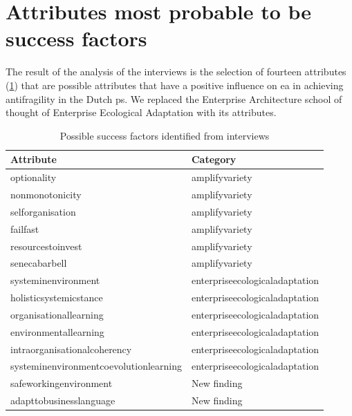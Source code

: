 \section{Attributes most probable to be success factors}
\label{sec:attributeslikelysf}
The result of the analysis of the interviews is the selection of fourteen attributes (\cref{tab:interviewpossiblesf}) that are possible attributes that have a positive influence on \gls{ea} in achieving \gls{antifragility} in the Dutch \gls{ps}. We replaced the Enterprise Architecture school of thought of Enterprise Ecological Adaptation with its \glspl{attribute}.
\begin{longtable}{@{}ll@{}}
	\toprule%
	\textbf{Attribute} & \textbf{Category}  \\%
	\midrule%
	\endhead%
	\hline
	\endfoot%
	\caption[Possible success factors identified from interviews]{Possible success factors identified from interviews}
	\label{tab:interviewpossiblesf}
	\endlastfoot%
	\Gls{optionality} & \Gls{amplifyvariety} \\%
	\Gls{nonmonotonicity} & \Gls{amplifyvariety} \\%
	\Gls{selforganisation} & \Gls{amplifyvariety} \\%
	\Gls{failfast} & \Gls{amplifyvariety} \\%
	\Gls{resourcestoinvest} & \Gls{amplifyvariety} \\%
	\Gls{senecabarbell} & \Gls{amplifyvariety} \\%
	\Gls{systeminenvironment} & \Gls{enterpriseecologicaladaptation} \\%
	\Gls{holisticsystemicstance} & \Gls{enterpriseecologicaladaptation} \\%
	\Gls{organisationallearning} & \Gls{enterpriseecologicaladaptation} \\%
	\Gls{environmentallearning} & \Gls{enterpriseecologicaladaptation} \\%
	\Gls{intraorganisationalcoherency} & \Gls{enterpriseecologicaladaptation} \\%
	\Gls{systeminenvironmentcoevolutionlearning} & \Gls{enterpriseecologicaladaptation} \\%
	\Gls{safeworkingenvironment} & New finding \\%
	\Gls{adapttobusinesslanguage} & New finding \\%
	\bottomrule%
\end{longtable}%
